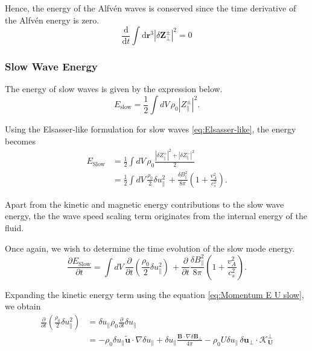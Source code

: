 Hence, the energy of the Alfv\'en waves is conserved since the time derivative of the Alfv\'en energy is zero.
\begin{equation}
    \label{eq:Alfven E cons}
    \frac{\mathrm{d}}{\mathrm{d} t} \int \mathrm{d}\boldsymbol{r}^3 |\delta \boldsymbol{Z}_{\perp}^{\pm}|^{2} = 0
\end{equation}

\subsubsection{Slow Wave Energy}
The energy of slow waves is given by the expression below.
\begin{equation*}
    E_{\mathrm{slow}} = \frac{1}{2} \int dV\, \rho_{0} \left| Z_{\parallel}^{\pm} \right|^{2}.
\end{equation*}

Using the Elsasser-like formulation for slow waves \eqref{eq:Elsasser-like}, the energy becomes
\begin{equation*}
\begin{split}
    E_{\mathrm{Slow}} &= \frac{1}{2} \int dV\, \rho_{0} \frac{\left| \delta Z_{\parallel}^{+} \right|^{2} + \left| \delta Z_{\parallel}^{-} \right|^{2}}{2}\\
    &=\frac{1}{2} \int dV\, \frac{\rho_{0}}{2}\delta u_{\parallel}^2\, + \frac{\delta B_{\parallel}^2}{8\pi} \left(1+ \frac{v_A^2}{c_s^2}\right).
\end{split}
\end{equation*}

Apart from the kinetic and magnetic energy contributions to the slow wave energy, the the wave speed scaling term originates from the internal energy of the fluid.

Once again, we wish to determine the time evolution of the slow mode energy.
\begin{equation*}
    \frac{\partial E_{\mathrm{Slow}}}{\partial t} = \int dV\, \frac{\partial}{\partial t}\left( \frac{\rho_{0}}{2}\delta u_{\parallel}^2\right)\, + \frac{\partial}{\partial t}\frac{\delta B_{\parallel}^2}{8\pi} \left(1+ \frac{v_A^2}{c_s^2}\right).
\end{equation*}

Expanding the kinetic energy term using the equation \eqref{eq:Momentum E U slow}, we obtain 
\begin{equation*}
\begin{split}
    \frac{\partial}{\partial t}\left( \frac{\rho_{0}}{2}\delta u_{\parallel}^2\right)
    &= \delta u_{\parallel}  \rho_{0} \frac{\partial}{\partial t} \delta u_{\parallel} \\
    &=-\rho_{0} \delta u_{\parallel}  \tilde{\boldsymbol{u}}\cdot \nabla\delta u_{\parallel} +  \delta u_{\parallel}  \frac{\boldsymbol{B}\cdot \nabla \delta \boldsymbol{B}_{\perp}}{4\pi} -\rho_0 U\delta u_{\parallel}\,\delta \boldsymbol{u}_{\perp} \cdot \boldsymbol{\mathcal{K}^{\perp}_{U}}
\end{split}
\end{equation*}

